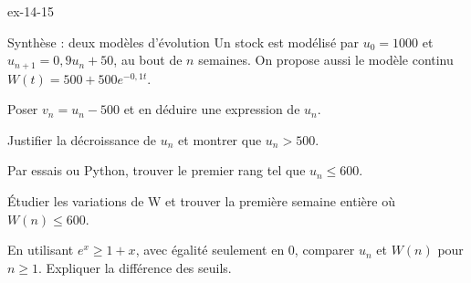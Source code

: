 \begin{blocLivre}{ex-14-15}
\begin{exercice}[3]{Synthèse : deux modèles d'évolution}
Un stock est modélisé par $u_0=1000$ et $u_{n+1}=0{,}9u_n+50$, au bout de $n$ semaines. On propose aussi le modèle continu $W(t)=500+500e^{-0{,}1t}$.\begin{questions}
\item Poser $v_n=u_n-500$ et en déduire une expression de $u_n$.
\item Justifier la décroissance de $u_n$ et montrer que $u_n>500$.
\item Par essais ou Python, trouver le premier rang tel que $u_n\leq600$.
\item Étudier les variations de W et trouver la première semaine entière où $W(n)\leq600$.
\item En utilisant $e^x\geq1+x$, avec égalité seulement en 0, comparer $u_n$ et $W(n)$ pour $n\geq1$. Expliquer la différence des seuils.
\end{questions}
\end{exercice}
\end{blocLivre}

